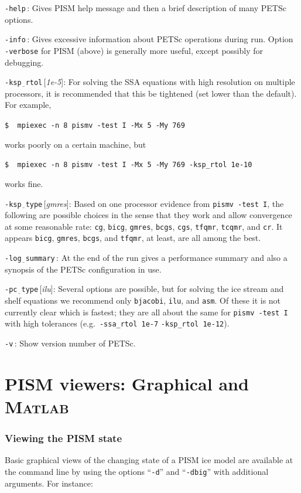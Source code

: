 \documentclass[11pt,final]{amsart}
\renewcommand{\t}[1]{\texttt{#1}}
\newcommand{\Matlab}{\textsc{Matlab}\xspace}
\newcommand{\rawopt}[1]{\vspace{1mm}\noindent \large\texttt{-#1}\normalsize}
\newcommand{\opt}[1]{\rawopt{#1}\,:\quad}
\newcommand{\optdef}[2]{\rawopt{#1}\,[\textsl{#2}]:\quad}
\newcommand{\und}{$\underline{\,\,\,}$}
\begin{document}
\opt{help}  Gives PISM help message and then a brief description of many PETSc options.

\opt{info}  Gives excessive information about PETSc operations during run.  Option \verb|-verbose| for PISM (above) is generally more useful, except possibly for debugging.

\optdef{ksp\und rtol}{1e-5}  For solving the SSA equations with high resolution on multiple processors, it is recommended that this be tightened (set lower than the default).  For example, 

\verb|$  mpiexec -n 8 pismv -test I -Mx 5 -My 769|

\noindent works poorly on a certain machine, but

\verb|$  mpiexec -n 8 pismv -test I -Mx 5 -My 769 -ksp_rtol 1e-10|

\noindent works fine.

\optdef{ksp\und type}{gmres}  Based on one processor evidence from \verb|pismv -test I|, the following are possible choices in the sense that they work and allow convergence at some reasonable rate: \t{cg}, \t{bicg}, \t{gmres}, \t{bcgs}, \t{cgs}, \t{tfqmr}, \t{tcqmr}, and \t{cr}.  It appears \t{bicg}, \t{gmres}, \t{bcgs}, and \t{tfqmr}, at least, are all among the best.

\opt{log\und summary}  At the end of the run gives a performance summary and also a synopsis of the PETSc configuration in use.

\optdef{pc\und type}{ilu}   Several options are possible, but for solving the ice stream and shelf equations we recommend only \t{bjacobi}, \t{ilu}, and \t{asm}.  Of these it is not currently clear which is fastest; they are all about the same for \verb|pismv -test I| with high tolerances (e.g.~\verb|-ssa_rtol 1e-7| \verb|-ksp_rtol 1e-12|).

\opt{v}   Show version number of PETSc.


\clearpage \newpage
\section{PISM viewers: Graphical and \Matlab}\label{sect:viewers}

\subsubsection*{Viewing the PISM state}  Basic graphical views of the changing state of a PISM ice model are available at the command line by using the options ``\t{-d}'' and ``\t{-dbig}'' with additional arguments.  For instance:
\end{document}
